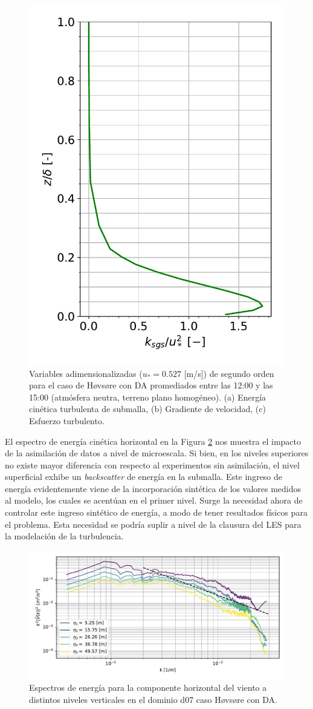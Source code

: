 \begin{figure}[H]
\begin{center}
		\includegraphics[height=0.5\linewidth,page=3,trim={12mm 5mm 3mm 0mm},clip]{Imagenes/06/hov_da/mean_data}%
	\end{center}
	\caption{Variables adimensionalizadas ($u_* = 0.527$ [m/s]) de segundo orden para el caso de Høvsøre con DA promediados entre las 12:00 y las 15:00 (atmósfera neutra, terreno plano homogéneo). (a) Energía cinética turbulenta de submalla, (b) Gradiente de velocidad, (c) Esfuerzo turbulento. }
	\label{fig:06_hov_da_mean_secondorder}
\end{figure}

El espectro de energía cinética horizontal en la Figura \ref{fig:06_hov_da_spectrum} nos muestra el impacto de la asimilación de datos a nivel de microescala. Si bien, en los niveles superiores no existe mayor diferencia con respecto al experimentos sin asimilación, el nivel superficial exhibe un \emph{backscatter} de energía en la submalla. Este ingreso de energía evidentemente viene de la incorporación sintética de los valores medidos al modelo, los cuales se acentúan en el primer nivel. Surge la necesidad ahora de controlar este ingreso sintético de energía, a modo de tener resultados físicos para el problema. Esta necesidad se podría suplir a nivel de la clausura del LES para la modelación de la turbulencia.

\begin{figure}[H]
	\centering
	\includegraphics[width=1.0\linewidth,page=1,trim={3mm 5mm 3mm 3mm},clip]{Imagenes/06/hov_da/spectra}%
	\caption{Espectros de energía para la componente horizontal del viento a distintos niveles verticales en el dominio d07 caso Høvsøre con DA.}
	\label{fig:06_hov_da_spectrum}
\end{figure}

